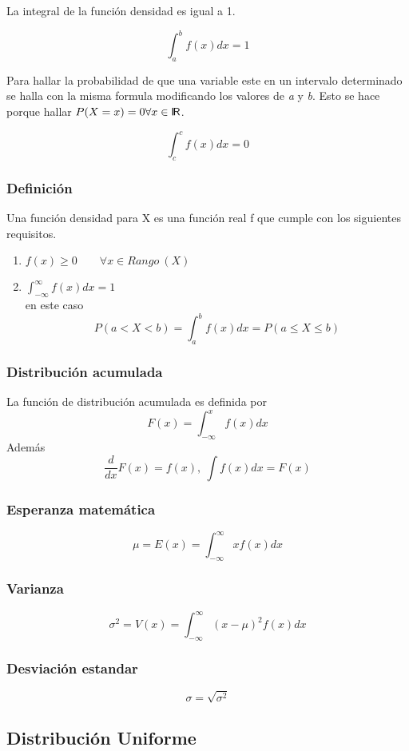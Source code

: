 \documentclass{article}
\begin{document}
La integral de la función densidad es igual a 1.

\[\int_{a}^{b}f(x)dx = 1\]

Para hallar la probabilidad de que una variable este en un intervalo determinado se halla con la misma formula modificando los valores de \textit{a} y \textit{b}. Esto se hace porque hallar $P(X = x) = 0 \forall x \in \textsf{I\kern-.3ex R}$.

\[\int_{c}^{c}f(x)dx = 0\]

\subsubsection*{Definición}
Una función densidad para X es una función real f que cumple con los siguientes requisitos.
\begin{enumerate}
    \item $f(x) \geq 0 \qquad \forall x \in Rango\ (X) $    
    \item $\int_{-\infty}^{\infty}f(x)dx=1$ \\
        en este caso 
        \[P(a < X < b) = \int_{a}^{b}f(x)dx = P(a \leq X \leq b)\]
\end{enumerate}

\subsubsection*{Distribución acumulada}
La función de distribución acumulada es definida por
\[F(x)=\int_{-\infty}^{x}f(x)dx\]
Además
\[\frac{d}{dx}F(x)=f(x),\ \int f(x) dx = F(x)\]

\subsubsection*{Esperanza matemática}
\[\mu = E(x)=\int_{-\infty}^{\infty}xf(x)dx\]

\subsubsection*{Varianza}
\[\sigma^{2} = V(x)=\int_{-\infty}^{\infty}(x-\mu)^{2}f(x)dx\]

\subsubsection*{Desviación estandar}
\[\sigma = \sqrt{\sigma^{2}}\]

\subsection{Distribución Uniforme}
\end{document}
